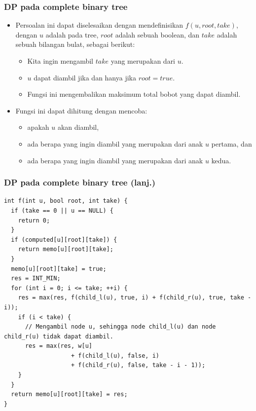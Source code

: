 \begin{frame}
\frametitle{DP pada complete binary tree}
\begin{itemize}
  \item Persoalan ini dapat diselesaikan dengan mendefinisikan $f(u, root, take)$, dengan $u$ adalah \fnode pada tree, $root$ adalah sebuah boolean, dan $take$ adalah sebuah bilangan bulat, sebagai berikut:
  \begin{itemize}
    \item Kita ingin mengambil $take$ \fnode yang merupakan \fsubtree dari $u$.
    \item \fNode $u$ dapat diambil jika dan hanya jika $root = true$.
    \item Fungsi ini mengembalikan maksimum total bobot \fnode yang dapat diambil.
  \end{itemize}
  \item Fungsi ini dapat dihitung dengan mencoba:
  \begin{itemize}
    \item apakah \fnode $u$ akan diambil,
    \item ada berapa \fnode yang ingin diambil yang merupakan \fsubtree dari anak $u$ pertama, dan
    \item ada berapa \fnode yang ingin diambil yang merupakan \fsubtree dari anak $u$ kedua.
  \end{itemize}
\end{itemize}
\end{frame}

\begin{frame}[fragile]
\frametitle{DP pada complete binary tree (lanj.)}
\begin{lstlisting}
int f(int u, bool root, int take) {
  if (take == 0 || u == NULL) {
    return 0;
  }
  if (computed[u][root][take]) {
    return memo[u][root][take];
  }
  memo[u][root][take] = true;
  res = INT_MIN;
  for (int i = 0; i <= take; ++i) {
    res = max(res, f(child_l(u), true, i) + f(child_r(u), true, take - i));
    if (i < take) {
      // Mengambil node u, sehingga node child_l(u) dan node child_r(u) tidak dapat diambil.
      res = max(res, w[u]
                   + f(child_l(u), false, i)
                   + f(child_r(u), false, take - i - 1));
    }
  }
  return memo[u][root][take] = res;
}
\end{lstlisting}
\end{frame}

